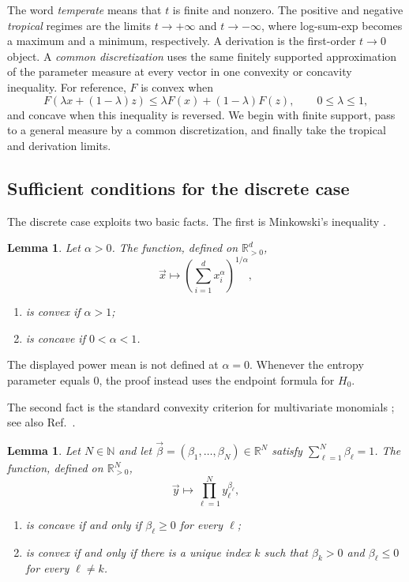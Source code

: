\documentclass[aps,pra,11pt,onecolumn,nofootinbib,tightenlines]{revtex4-2}
\newtheorem{lemma}[theorem]{Lemma}
\theoremstyle{definition}
\newcommand{\R}{\mathbb{R}}
\newcommand{\mb}[1]{\mathbb{#1}}
\begin{document}
The word \emph{temperate} means that $t$ is finite and nonzero.  The positive
and negative \emph{tropical} regimes are the limits $t\to+\infty$ and
$t\to-\infty$, where log-sum-exp becomes a maximum and a minimum,
respectively.  A derivation is the first-order $t\to0$ object.  A
\emph{common discretization} uses the same finitely supported approximation
of the parameter measure at every vector in one convexity or concavity
inequality.  For reference, $F$ is convex when
\[
F(\lambda x+(1-\lambda)z)
\leq \lambda F(x)+(1-\lambda)F(z),
\qquad 0\leq\lambda\leq1,
\]
and concave when this inequality is reversed.  We begin with finite support,
pass to a general measure by a common discretization, and finally take the
tropical and derivation limits.

\subsection{Sufficient conditions for the discrete case}

The discrete case exploits two basic facts.  The first is Minkowski's inequality
\cite[Theorem~9]{bullen2013handbook}.

\begin{lemma}
\label{lem:Minkowski}
Let $\alpha>0$.  The function, defined on
$\R^d_{>0}$,
\begin{equation}
\vec{x}\longmapsto\left(\sum_{i=1}^d x_i^\alpha\right)^{1/\alpha},
\end{equation}
\begin{enumerate}[itemsep=1pt]
\item is convex if $\alpha>1$;
\item is concave if $0<\alpha<1$.
\end{enumerate}
\end{lemma}

The displayed power mean is not defined at $\alpha=0$.  Whenever the entropy
parameter equals $0$, the proof instead uses the endpoint formula for $H_0$.

The second fact is the standard convexity criterion for multivariate monomials
\cite[Lemma~8]{mu21_renyi}; see also Ref.~\cite[Proposition~13]{farooq2024matrix}.

\begin{lemma}
\label{lem:Matrix-majorization}
Let $N\in\mb{N}$ and let
$\vec{\beta}=(\beta_1,\ldots,\beta_N)\in\R^N$ satisfy
$\sum_{\ell=1}^N\beta_\ell=1$.  The function, defined on
$\R^N_{>0}$,
\begin{equation}
\vec{y}\longmapsto\prod_{\ell=1}^N y_\ell^{\beta_\ell},
\end{equation}
\begin{enumerate}[itemsep=1pt]
\item is concave if and only if $\beta_\ell\geq0$ for every $\ell$;
\item is convex if and only if there is a unique index $k$ such that
$\beta_k>0$ and $\beta_\ell\leq0$ for every $\ell\neq k$.
\end{enumerate}
\end{lemma}
\end{document}

